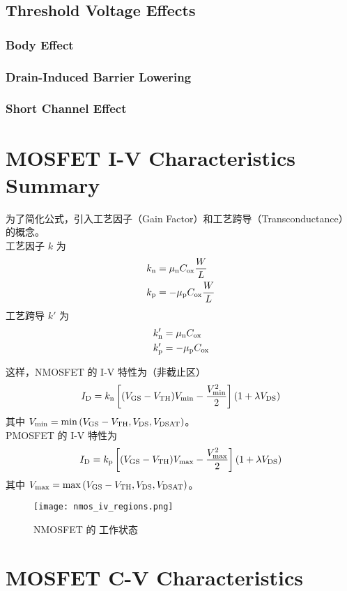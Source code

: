 \subsection{Threshold Voltage Effects}
\subsubsection{Body Effect}

\subsubsection{Drain-Induced Barrier Lowering}

\subsubsection{Short Channel Effect}

\section{MOSFET I-V Characteristics Summary}

为了简化公式，引入工艺因子（Gain Factor）和工艺跨导（Transconductance）的概念。\\
工艺因子 $k$ 为
\begin{equation}
    \begin{aligned}
        k_{\rm{n}} &= \mu_{\rm{n}} C_{\rm{ox}} \frac{W}{L} \\
        k_{\rm{p}} &= -\mu_{\rm{p}} C_{\rm{ox}} \frac{W}{L}
    \end{aligned}
\end{equation}
工艺跨导 $k'$ 为
\begin{equation}
    \begin{aligned}
        k'_{\rm{n}} &= \mu_{\rm{n}} C_{\rm{ox}} \\
        k'_{\rm{p}} &= -\mu_{\rm{p}} C_{\rm{ox}}
    \end{aligned}
\end{equation}

这样，NMOSFET 的 I-V 特性为（非截止区）
\begin{equation}
    I_{\rm{D}} = k_{\rm{n}} \left[ (V_{\rm{GS}} - V_{\rm{TH}}) V_{\rm{min}} - \frac{V_{\rm{min}}^2}{2} \right] \left(1 + \lambda V_{\rm{DS}}\right)
\end{equation}
其中 $V_{\rm{min}} = \min \left(V_{\rm{GS}} - V_{\rm{TH}}, V_{\rm{DS}}, V_{\rm{DSAT}}\right)$。\\
PMOSFET 的 I-V 特性为
\begin{equation}
    I_{\rm{D}} = k_{\rm{p}} \left[ (V_{\rm{GS}} - V_{\rm{TH}}) V_{\rm{max}} - \frac{V_{\rm{max}}^2}{2} \right] \left(1 + \lambda V_{\rm{DS}}\right)
\end{equation}
其中 $V_{\rm{max}} = \max \left(V_{\rm{GS}} - V_{\rm{TH}}, V_{\rm{DS}}, V_{\rm{DSAT}}\right)$。

\begin{figure}[!hbt]
    \centering
    \texttt{[image: nmos\_iv\_regions.png]}
    \caption{NMOSFET 的 工作状态}
    \label{fig:nmos_iv_regions}
\end{figure}

\section{MOSFET C-V Characteristics}
